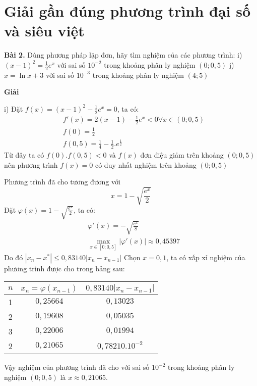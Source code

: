 \chapter{Giải gần đúng phương trình đại số và siêu việt}

\textbf{\color{blue}Bài 2.} Dùng phương pháp lặp đơn, hãy tìm nghiệm của các phương trình:
i) $(x-1)^2=\frac{1}{2}e^x$ với sai số $10^{-2}$ trong khoảng phân ly nghiệm $(0;0,5)$
j) $x=\ln x+3$ với sai số $10^{-3}$ trong khoảng phân ly nghiệm $(4;5)$

\textbf{Giải}

i) Đặt $f(x)=(x-1)^2-\frac{1}{2}e^x=0$, ta có:
\begin{align*}
	&f'(x) =2(x-1)-\frac{1}{2}e^x<0 \forall x\in (0;0,5)\\
	&f(0)  =\frac{1}{2}\\
	&f(0,5)=\frac{1}{4}-\frac{1}{2}.e^{\frac{1}{2}}
\end{align*}
Từ đây ta có $f(0).f(0,5)<0$ và $f(x)$ đơn điệu giảm trên khoảng $(0;0,5)$ nên phương trình $f(x)=0$ có duy nhất nghiệm trên khoảng $(0;0,5)$\par

Phương trình đã cho tương đương với $$x=1-\sqrt{\frac{e^x}{2}}$$
Đặt $\varphi (x)=1-\sqrt{\frac{e^x}{2}}$, ta có:
\begin{align*}
	&\varphi'(x)=-\sqrt{\frac{e^x}{8}}\\
	&\max_{x\in [0;0,5]} |\varphi'(x)|\approx 0,45397
\end{align*}
Do đó $|x_n-x^*|\leqslant 0,83140|x_n-x_{n-1}|$
Chọn $x=0,1$, ta có xấp xỉ nghiệm của phương trình được cho trong bảng sau:

\begin{center}
\begin{tabular}{|c|c|c|}\hline
$n$&$x_n=\varphi(x_{n-1})$&$0,83140|x_n-x_{n-1}|$\\ \hline
1&$0,25664$&$0,13023$\\ \hline
2&$0,19608$&$0,05035$\\ \hline
3&$0,22006$&$0,01994$\\ \hline
2&$0,21065$&$0,78210.10^{-2}$\\ \hline
\end{tabular}
\end{center}

Vậy nghiệm của phương trình đã cho với sai số $10^{-2}$ trong khoảng phân ly nghiệm $(0;0,5)$ là $x\approx 0,21065$.\par

